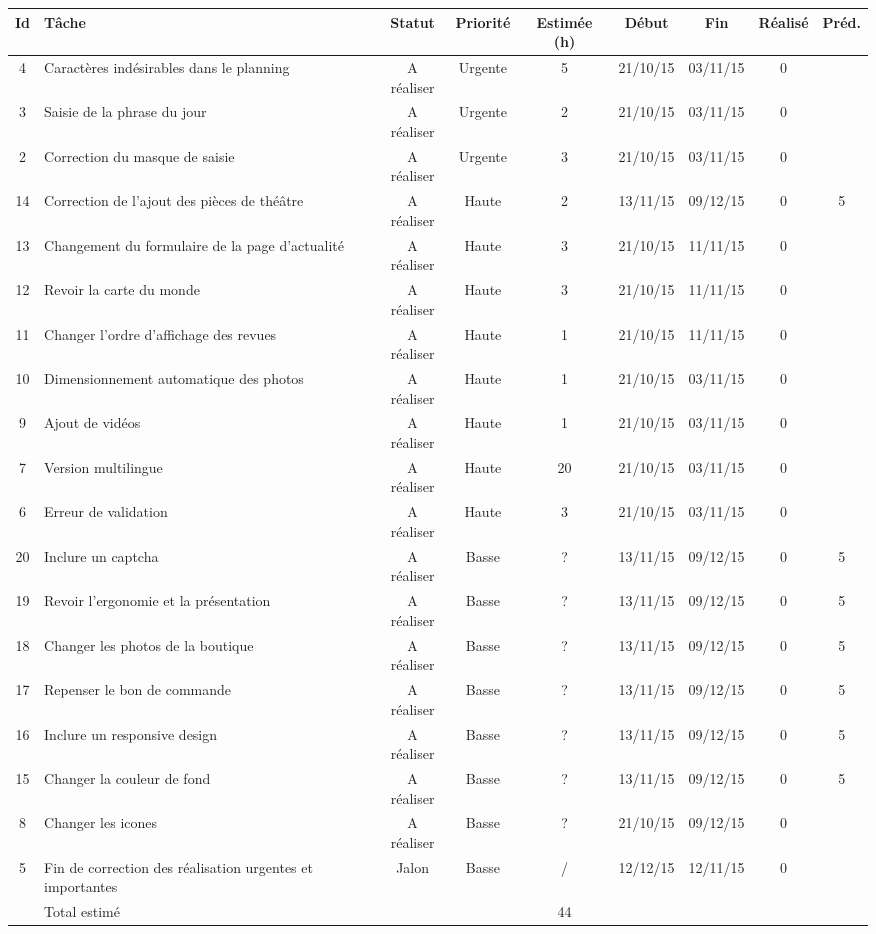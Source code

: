 
\begin{tabular}{ | c | p{4cm} | c | c | c | c | c | c | c |  }
\hline 
Id & Tâche & Statut & Priorité & Estimée (h) & Début & Fin & Réalisé &
Préd. \\ \hline

4 & Caractères indésirables dans le planning & A réaliser & Urgente & 5 & 21/10/15
	& 03/11/15 & 0 & \\ \hline
3 & Saisie de la phrase du jour & A réaliser & Urgente & 2 & 21/10/15 & 03/11/15
	& 0 & \\ \hline
2 & Correction du masque de saisie & A réaliser & Urgente & 3 & 21/10/15 &
	03/11/15 & 0 & \\ \hline
	
14 & Correction de l'ajout des pièces de théâtre & A réaliser & Haute & 2 &
	13/11/15 & 09/12/15 & 0 & 5 \\ \hline
13 & Changement du formulaire de la page d'actualité & A réaliser & Haute & 3 &
	21/10/15 & 11/11/15 & 0 & \\ \hline
12 & Revoir la carte du monde & A réaliser & Haute & 3 & 21/10/15 & 11/11/15 & 0
	& \\ \hline
11 & Changer l'ordre d'affichage des revues & A réaliser & Haute & 1 & 21/10/15
	& 11/11/15 & 0 & \\ \hline
10 & Dimensionnement automatique des photos & A réaliser & Haute & 1 & 21/10/15
	& 03/11/15 & 0 & \\ \hline
9 & Ajout de vidéos & A réaliser & Haute & 1 & 21/10/15 & 03/11/15 & 0 & \\
\hline
7 & Version multilingue & A réaliser & Haute & 20 & 21/10/15 & 03/11/15 & 0 & \\
\hline
6 & Erreur de validation & A réaliser & Haute & 3 & 21/10/15 & 03/11/15 & 0 & \\
\hline



	
20 & Inclure un captcha & A réaliser & Basse & ? & 13/11/15 &
	09/12/15 & 0 & 5 \\ \hline
19 & Revoir l'ergonomie et la présentation & A réaliser & Basse & ? & 13/11/15
	& 09/12/15 & 0 & 5 \\ \hline
18 & Changer les photos de la boutique & A réaliser & Basse & ? & 13/11/15 &
	09/12/15 & 0 & 5 \\ \hline
17 & Repenser le bon de commande & A réaliser & Basse & ? & 13/11/15 & 09/12/15
	& 0 & 5 \\ \hline
16 & Inclure un responsive design & A réaliser & Basse & ? &
	13/11/15 & 09/12/15 & 0 & 5 \\ \hline
15 & Changer la couleur de fond & A réaliser & Basse & ? & 13/11/15 & 09/12/15
	& 0 & 5  \\ \hline
8 & Changer les icones & A réaliser & Basse & ? & 21/10/15 & 09/12/15 & 0 & \\
\hline


5 & Fin de correction des réalisation urgentes et importantes & Jalon & Basse &
	/ & 12/12/15 & 12/11/15 & 0 & \\ \hline
	
 & Total estimé &  &  & 44 &  &  & & \\ \hline
 \end{tabular}
